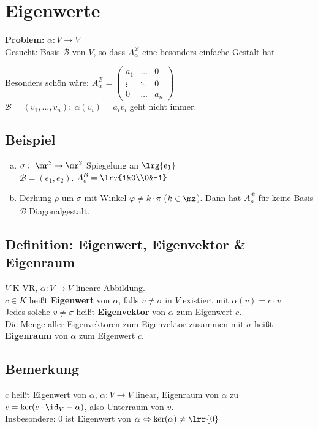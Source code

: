 \newpage
\section{Eigenwerte}
  \textbf{Problem:} $\alpha:V\rightarrow V$\\
  Gesucht: Basis $\mathcal{B}$  von $V$, so dass $A_\alpha^{\mathcal{B}}$ eine
  besonders einfache Gestalt hat.

  Besonders schön wäre: $A_\alpha^{\mathcal{B}}=
  \begin{pmatrix}
    a_1&\dots&0\\
    \vdots&\ddots&0\\
    0&\dots&a_n
  \end{pmatrix}$\\
  $\mathcal{B}=(v_1,...,v_n):\ \alpha(v_i)=a_iv_i$ geht nicht immer.

\subsection{Beispiel}
  \begin{enumerate}[a)]
    \item $\sigma:\ \mr^2\rightarrow\mr^2$ Spiegelung an $\lrg{e_1}$\\
      $\mathcal{B}=(e_1,e_2)$. $A_\sigma^{\mathcal{B}}=\lrv{1&0\\0&-1}$
    \item Derhung $\rho$ um $\sigma$ mit Winkel $\varphi\neq k\cdot\pi$
      ($k\in\mz$). Dann hat $A_\rho^{\mathcal{B}}$ für keine Basis
      ${\mathcal{B}}$ Diagonalgestalt.
  \end{enumerate}

\subsection{Definition: Eigenwert, Eigenvektor \& Eigenraum}
  $V$ K-VR, $\alpha:V\rightarrow V$ lineare Abbildung.\\
  $c\in K$ heißt \textbf{Eigenwert} von $\alpha$, falls $v\neq\sigma$ in $V$
  existiert mit $\alpha(v)=c\cdot v$\\
  Jedes solche $v\neq\sigma$ heißt \textbf{Eigenvektor} von $\alpha$ zum
  Eigenwert $c$.\\
  Die Menge aller Eigenvektoren zum Eigenvektor zusammen mit $\sigma$ heißt
  \textbf{Eigenraum} von $\alpha$ zum Eigenwert $c$.

\subsection{Bemerkung}
  $c$ heißt Eigenwert von $\alpha$, $\alpha:V\rightarrow V$ linear, Eigenraum
  von $\alpha$ zu $c=\mbox{ker}(c\cdot\id_V-\alpha)$, also Unterraum von $v$.\\
  Insbesondere: $0$ ist Eigenwert von
  $\alpha\Leftrightarrow\mbox{ker}(\alpha)\neq\lrr{0}$

